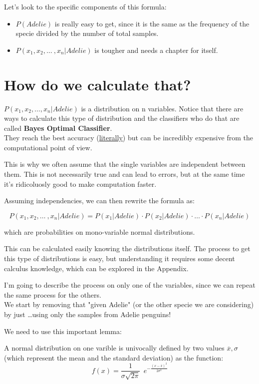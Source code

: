 \documentclass[11pt]{article}
\begin{document}
Let's look to the specific components of this formula:
\begin{itemize}
    \item $P(Adelie)$ is really easy to get, since it is the same as the
          frequency of the specie divided by the number of total samples.
    \item $P(x_1,x_2, \dots \ , x_n|Adelie)$ is tougher and needs a chapter for
          itself.
\end{itemize}

\section*{How do we calculate that?}

$P(x_1,x_2, \dots , x_n|Adelie)$ is a distribution on n variables. Notice that
there are ways to calculate this type of distribution and the classifiers who do
that are called \textbf{Bayes Optimal Classifier}. \\
They reach the best accuracy
(\href{https://en.wikipedia.org/wiki/Bayes_classifier}{literally}) but can be
incredibly expensive from the computational point of view.

This is why we often assume that the single variables are independent between
them. This is not necessarily true and can lead to errors, but at the same time
it's ridicoluosly good to make computation faster.

Assuming independencies, we can then rewrite the formula as:

\[
    P(x_1,x_2, \dots \ , x_n|Adelie) = P(x_1|Adelie) \cdot P(x_2|Adelie) \cdot \dots \cdot P(x_n|Adelie)
\]

which are probabilities on mono-variable normal distributions.

This can be calculated easily knowing the distributions itself. The process to
get this type of distributions is easy, but understanding it requires some
decent calculus knowledge, which can be explored in the Appendix.

I'm going to describe the process on only one of the variables, since we can
repeat the same process for the others.\\
We start by removing that "given Adelie" (or the other specie we are
considering) by just \dots using only the samples from Adelie penguins!

We need to use this important lemma:
\begin{lemma}{}{}
    A normal distribution on one varible is univocally defined by two values
    $\overline{x}, \sigma$ (which represent the mean and the standard deviation)
    as the function:
    \[
        f(x) = \frac{1}{\sigma \sqrt{2\pi}} \ \ e^{- \frac{(x-\overline{x})^2}{2\sigma^2}}
    \]
\end{lemma}
\end{document}

